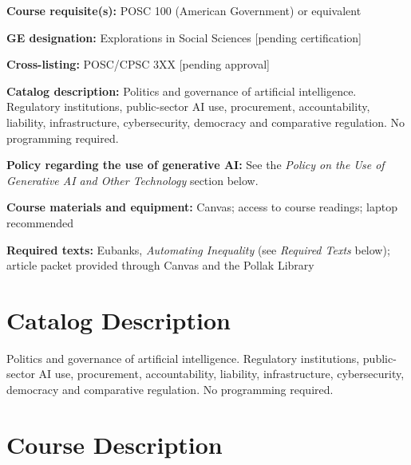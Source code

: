 \documentclass[12pt]{article}
\begin{document}
\vspace{0.5em}
\begin{flatlist}
\item \textbf{Course requisite(s):} POSC 100 (American Government) or equivalent
\item \textbf{GE designation:} Explorations in Social Sciences [pending certification]
\item \textbf{Cross-listing:} POSC/CPSC 3XX [pending approval]
\item \textbf{Catalog description:} Politics and governance of artificial intelligence. Regulatory institutions, public-sector AI use, procurement, accountability, liability, infrastructure, cybersecurity, democracy and comparative regulation. No programming required.
\item \textbf{Policy regarding the use of generative AI:} See the \emph{Policy on the Use of Generative AI and Other Technology} section below.
\item \textbf{Course materials and equipment:} Canvas; access to course readings; laptop recommended
\item \textbf{Required texts:} Eubanks, \emph{Automating Inequality} (see \emph{Required Texts} below); article packet provided through Canvas and the Pollak Library
\end{flatlist}

\section*{Catalog Description}
Politics and governance of artificial intelligence. Regulatory institutions, public-sector AI use, procurement, accountability, liability, infrastructure, cybersecurity, democracy and comparative regulation. No programming required.

\section*{Course Description}
\end{document}

